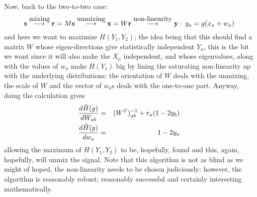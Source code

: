 \documentclass[12pt]{article}
\begin{document}
Now, back to the two-to-two case: 
\begin{equation}
{\bf s}\stackrel{\mbox{mixing}}{\longrightarrow}{\bf r}=M{\bf s}\stackrel{\mbox{unmixing}}{\longrightarrow}{\bf x}=W{\bf r}\stackrel{\mbox{non-linearity}}{\longrightarrow}{\bf y}:\,y_a=g(x_a+w_a)
\end{equation}
and here we want to maximize $H(Y_1,Y_2)$; the idea being that this
should find a matrix $W$ whose eigen-directions give statistically
independent $Y_a$, this is the bit we want since it will also make the
$X_a$ independent, and whose eigenvalues, along with the values of
$w_a$ make $H(Y_1)$ big by lining the saturating non-linearity up with
the underlying distributions: the orientation of $W$ deals with the
unmixing, the scale of $W$ and the vector of $w_a$s deals with the
one-to-one part. Anyway, doing the calculation gives 
\begin{eqnarray}
\frac{d\tilde{H}(y)}{dW_{ab}}&=&(W^T)^{-1}_{ab}+r_a(1-2y_b)\cr
\frac{d\tilde{H}(y)}{dw_a}&=&1-2y_a
\end{eqnarray}
allowing the maximum of $H(Y_1,Y_2)$ to be, hopefully, found and this,
again, hopefully, will unmix the signal. Note that this algorithm is
not as blind as we might of hoped, the non-linearity needs to be
chosen judiciously: however, the algorithm is reasonably robust;
reasonably successful and certainly interesting mathematically.







{}
\end{document}
